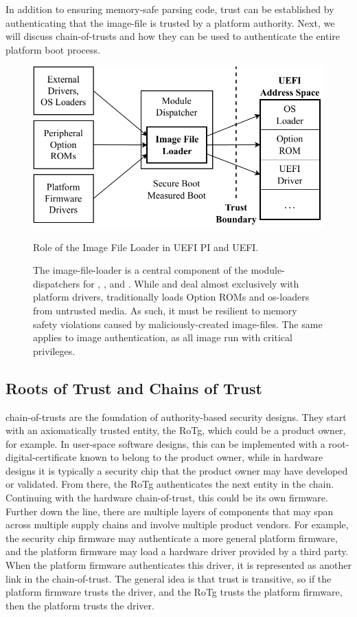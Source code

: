 In addition to ensuring memory-safe parsing code, trust can be established by authenticating that the \gls{image-file} is trusted by a platform authority. Next, we will discuss \glspl{chain-of-trust} and how they can be used to authenticate the entire platform boot process.

\begin{figure}[htb]
  \centering
  \includegraphics{Figures/UefiLoader.pdf}
  \caption{Role of the Image File Loader in UEFI PI and UEFI.}
  \caption*{The \gls{image-file-loader} is a central component of the \glspl{module-dispatcher} for , , and . While  and  deal almost exclusively with platform drivers,  traditionally loads Option ROMs and \glspl{os-loader} from untrusted media. As such, it must be resilient to memory safety violations caused by maliciously-created \glspl{image-file}. The same applies to \gls{image} authentication, as all \gls{image} run with critical privileges.}
\end{figure}

\subsection{Roots of Trust and Chains of Trust}

\Glspl{chain-of-trust} are the foundation of authority-based security designs. They start with an axiomatically trusted entity, the \gls{RoTg}, which could be a product owner, for example. In user-space software designs, this can be implemented with a \gls{root-digital-certificate} known to belong to the product owner, while in hardware designs it is typically a security chip that the product owner may have developed or validated. From there, the \gls{RoTg} authenticates the next entity in the chain. Continuing with the hardware \gls{chain-of-trust}, this could be its own \gls{firmware}. Further down the line, there are multiple layers of components that may span across multiple supply chains and involve multiple product vendors. For example, the security chip \gls{firmware} may authenticate a more general platform \gls{firmware}, and the platform \gls{firmware} may load a hardware driver provided by a third party. When the platform \gls{firmware} authenticates this driver, it is represented as another link in the \gls{chain-of-trust}. The general idea is that trust is transitive, so if the platform \gls{firmware} trusts the driver, and the \gls{RoTg} trusts the platform \gls{firmware}, then the platform trusts the driver.


